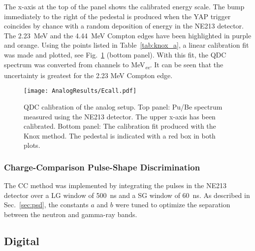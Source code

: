 \documentclass[main.tex]{subfiles}
\begin{document}
The x-axis at the top of the panel shows the calibrated energy scale. The bump immediately to the right of the pedestal is produced when the YAP trigger coincides by chance with a random deposition of energy in the NE213 detector. The \SI{2.23}{MeV} and the \SI{4.44}{MeV} Compton edges have been highlighted in purple and orange. Using the points listed in Table~\ref{tab:knox_a}, a linear calibration fit was made and plotted, see Fig.~\ref{fig:qdc_a} (bottom panel). With this fit, the QDC spectrum was converted from channels to \si{MeV_{\textit{ee}}}. It can be seen that the uncertainty is greatest for the 2.23 \si{\MeV} Compton edge.
\begin{figure}[ht!]
    \centering
        \texttt{[image: AnalogResults/Ecall.pdf]}
        \caption[QDC calibration of the analog setup.]{QDC calibration of the analog setup. Top panel: Pu/Be spectrum measured using the NE213 detector. The upper x-axis has been calibrated. Bottom panel: The calibration fit produced with the Knox method. The pedestal is indicated with a red box in both plots.}
    \label{fig:qdc_a}
\end{figure}

\subsubsection{Charge-Comparison Pulse-Shape Discrimination}
The CC method was implemented by integrating the pulses in the NE213 detector over a LG window of \SI{500}{ns} and a SG window of \SI{60}{ns}. As described in Sec.~\ref{sec:psd}, the constants $a$ and $b$ were tuned to optimize the separation between the neutron and gamma-ray bands.




\subsection{Digital}
\end{document}
